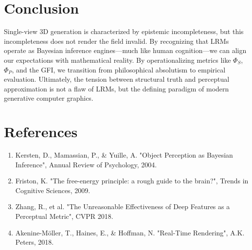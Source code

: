 \documentclass[10pt,journal,compsoc]{IEEEtran}
\begin{document}
\section{Conclusion}
Single-view 3D generation is characterized by epistemic incompleteness, but this incompleteness does not render the field invalid. By recognizing that LRMs operate as Bayesian inference engines—much like human cognition—we can align our expectations with mathematical reality. By operationalizing metrics like $\Phi_S$, $\Phi_P$, and the GFI, we transition from philosophical absolutism to empirical evaluation. Ultimately, the tension between structural truth and perceptual approximation is not a flaw of LRMs, but the defining paradigm of modern generative computer graphics.

\section*{References}
\begin{enumerate}
    \item Kersten, D., Mamassian, P., \& Yuille, A. "Object Perception as Bayesian Inference", Annual Review of Psychology, 2004.
    \item Friston, K. "The free-energy principle: a rough guide to the brain?", Trends in Cognitive Sciences, 2009.
    \item Zhang, R., et al. "The Unreasonable Effectiveness of Deep Features as a Perceptual Metric", CVPR 2018.
    \item Akenine-Möller, T., Haines, E., \& Hoffman, N. "Real-Time Rendering", A.K. Peters, 2018.
\end{enumerate}
\end{document}

